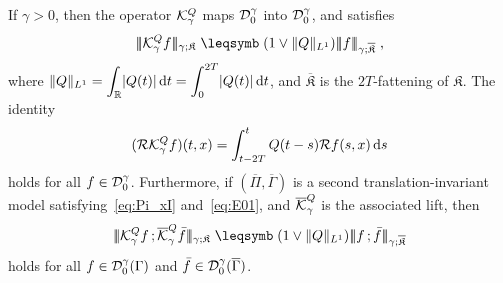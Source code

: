 \documentclass[reqno,11pt]{article}
\def\normDgamma#1{|\!|\!|#1|\!|\!|}
\def\seminormff#1#2{|\!|\!|#1\,\mathord{;}\,#2|\!|\!|}
\def\fraK{\mathfrak{K}}
\def\fraKbar{\overline{\mathfrak{K}}}
\def\Gammabar{\overline\Gamma}
\def\Pibar{\overline\Pi}
\begin{document}
\begin{prop}
\label{prop:Schauder_E} 
If $\gamma>0$, then the operator ${\mathcal K}^Q_\gamma$ maps ${\mathcal D}^\gamma_0$ into
${\mathcal D}^\gamma_0$, and satisfies 
\begin{equation}
 \label{eq:norm_E}
 \normDgamma{\cK^Q_\gamma f}_{\gamma;\fraK}
 \leqs (1\vee\norm{Q}_{L^1})\normDgamma{f}_{\gamma;\fraKbar}\;,
\end{equation} 
where $\lVert Q\rVert_{L^1} = \displaystyle\int_{\mathbb{R}}
\lvert Q(t)\rvert\operatorname{d}\!t=\displaystyle\int_0^{2T} \lvert Q(t)\rvert\operatorname{d}\!t$, and $\fraKbar$
is the $2T$-fattening of $\fraK$. The identity 
\begin{equation}
 \label{eq:REf_KRf}
  (\cR\cK^Q_\gamma f)(t,x) = \int_{t-2T}^t Q(t-s)\cR f(s,x)\6s
\end{equation} 
holds for all $f\in{\mathcal D}^\gamma_0$. Furthermore, if $(\Pibar,\Gammabar)$ is a
second translation-invariant model satisfying~\eqref{eq:Pi_xI}
and~\eqref{eq:E01}, and $\overline{{\mathcal K}}^Q_\gamma$ is the associated lift, then 
\begin{equation}
 \label{eq:Schauder_bounds}
 \seminormff{\cK^Q_\gamma f}{\overline{\cK}^Q_\gamma \bar f}_{\gamma;\fraK} 
 \leqs (1\vee\norm{Q}_{L^1})\seminormff{f}{\bar f}_{\gamma;\fraKbar}
\end{equation} 
holds for all $f\in{\mathcal D}^\gamma_0(\Gamma)$ and $\bar
f\in\cD^\gamma_0(\Gammabar)$. 
\end{prop}
%
\end{document}
